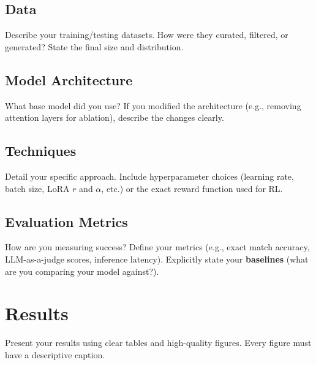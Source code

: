 \documentclass[11pt, twocolumn]{article}
\begin{document}
\subsection{Data}
Describe your training/testing datasets. How were they curated, filtered, or generated? State the final size and distribution.

\subsection{Model Architecture}
What base model did you use? If you modified the architecture (e.g., removing attention layers for ablation), describe the changes clearly.

\subsection{Techniques}
Detail your specific approach. Include hyperparameter choices (learning rate, batch size, LoRA $r$ and $\alpha$, etc.) or the exact reward function used for RL. 

\subsection{Evaluation Metrics}
How are you measuring success? Define your metrics (e.g., exact match accuracy, LLM-as-a-judge scores, inference latency). Explicitly state your \textbf{baselines} (what are you comparing your model against?).

\section{Results}
Present your results using clear tables and high-quality figures. Every figure must have a descriptive caption. 

\begin{table}[h]
\centering
\caption{Example of a professional results table.}
\label{tab:results}
\end{table}
\end{document}
